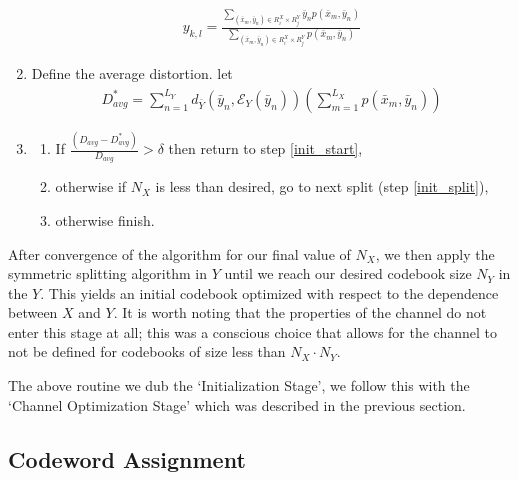 \begin{enumerate}
    \begin{align}
        y_{k,l} = 
            \frac{\sum_{(\bar x_m,\bar y_n)\in R_i^X\times R_j^Y}\bar y_n p(\bar x_m,\bar y_n)}
            {\sum_{(\bar x_m,\bar y_n)\in R_i^X\times R_j^Y}p(\bar x_m,\bar y_n)}
    \end{align}
    \item Define the average distortion. let
    \begin{align}
        D_{avg}^* = \sum_{n=1}^{L_Y}d_{\bar Y}(\bar y_n, \mathcal E_Y(\bar y_n))\left(\sum_{m=1}^{L_X}p(\bar x_m,\bar y_n)\right)
    \end{align}
    \item
    \begin{enumerate}
        \item
        If
        $\frac
        {(D_{avg} - D^*_{avg})}
        {D_{avg}}
        > \delta$
        then return to step \ref{init_start},
        \item
        otherwise if $N_X$ is less than desired, go to next split (step \ref{init_split}),
        \item
        otherwise finish.
    \end{enumerate}
\end{enumerate}

After convergence of the algorithm for our final value of $N_X$, we then apply the symmetric splitting algorithm in $Y$ until we reach our desired codebook size $N_Y$ in the $Y$. This yields an initial codebook optimized with respect to the dependence between $X$ and $Y$. It is worth noting that the properties of the channel do not enter this stage at all; this was a conscious choice that allows for the channel to not be defined for codebooks of size less than $N_X\cdot N_Y$.

The above routine we dub the `Initialization Stage', we follow this with the `Channel Optimization Stage' which was described in the previous section.



\subsection{Codeword Assignment}


